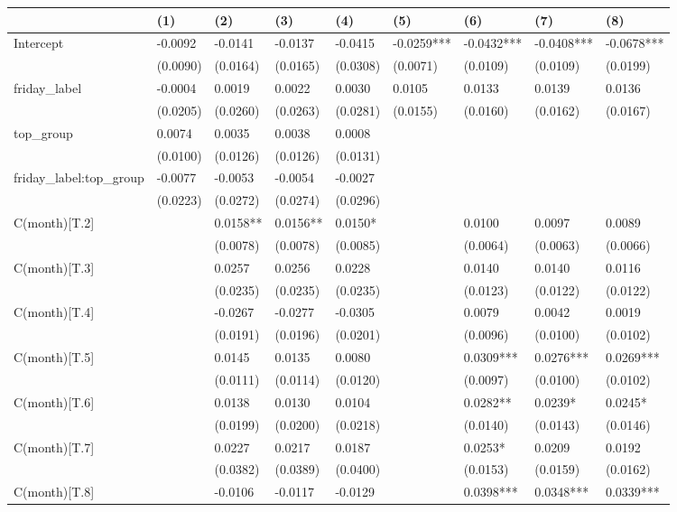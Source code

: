 \begin{tabular}{lllllllll}
\toprule
 & (1) & (2) & (3) & (4) & (5) & (6) & (7) & (8) \\
\midrule
Intercept & -0.0092 & -0.0141 & -0.0137 & -0.0415 & -0.0259*** & -0.0432*** & -0.0408*** & -0.0678*** \\
 & (0.0090) & (0.0164) & (0.0165) & (0.0308) & (0.0071) & (0.0109) & (0.0109) & (0.0199) \\
friday_label & -0.0004 & 0.0019 & 0.0022 & 0.0030 & 0.0105 & 0.0133 & 0.0139 & 0.0136 \\
 & (0.0205) & (0.0260) & (0.0263) & (0.0281) & (0.0155) & (0.0160) & (0.0162) & (0.0167) \\
top_group & 0.0074 & 0.0035 & 0.0038 & 0.0008 &  &  &  &  \\
 & (0.0100) & (0.0126) & (0.0126) & (0.0131) &  &  &  &  \\
friday_label:top_group & -0.0077 & -0.0053 & -0.0054 & -0.0027 &  &  &  &  \\
 & (0.0223) & (0.0272) & (0.0274) & (0.0296) &  &  &  &  \\
C(month)[T.2] &  & 0.0158** & 0.0156** & 0.0150* &  & 0.0100 & 0.0097 & 0.0089 \\
 &  & (0.0078) & (0.0078) & (0.0085) &  & (0.0064) & (0.0063) & (0.0066) \\
C(month)[T.3] &  & 0.0257 & 0.0256 & 0.0228 &  & 0.0140 & 0.0140 & 0.0116 \\
 &  & (0.0235) & (0.0235) & (0.0235) &  & (0.0123) & (0.0122) & (0.0122) \\
C(month)[T.4] &  & -0.0267 & -0.0277 & -0.0305 &  & 0.0079 & 0.0042 & 0.0019 \\
 &  & (0.0191) & (0.0196) & (0.0201) &  & (0.0096) & (0.0100) & (0.0102) \\
C(month)[T.5] &  & 0.0145 & 0.0135 & 0.0080 &  & 0.0309*** & 0.0276*** & 0.0269*** \\
 &  & (0.0111) & (0.0114) & (0.0120) &  & (0.0097) & (0.0100) & (0.0102) \\
C(month)[T.6] &  & 0.0138 & 0.0130 & 0.0104 &  & 0.0282** & 0.0239* & 0.0245* \\
 &  & (0.0199) & (0.0200) & (0.0218) &  & (0.0140) & (0.0143) & (0.0146) \\
C(month)[T.7] &  & 0.0227 & 0.0217 & 0.0187 &  & 0.0253* & 0.0209 & 0.0192 \\
 &  & (0.0382) & (0.0389) & (0.0400) &  & (0.0153) & (0.0159) & (0.0162) \\
C(month)[T.8] &  & -0.0106 & -0.0117 & -0.0129 &  & 0.0398*** & 0.0348*** & 0.0339*** \\

\end{tabular}
